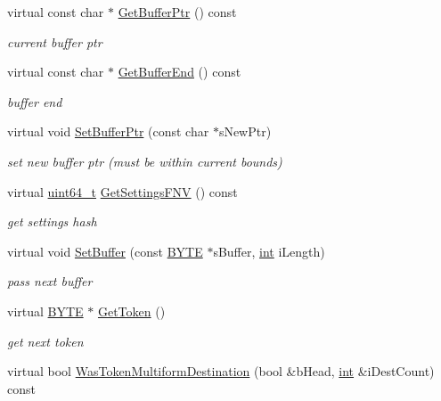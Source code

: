 \begin{DoxyCompactItemize}
virtual const char $\ast$ \hyperlink{classCSphTokenFilter_aafff5045f71b3c81e18985a59659bd18}{Get\-Buffer\-Ptr} () const 
\begin{DoxyCompactList}\small\item\em current buffer ptr \end{DoxyCompactList}\item 
virtual const char $\ast$ \hyperlink{classCSphTokenFilter_a01cda57b77357102db0d645db112fe66}{Get\-Buffer\-End} () const 
\begin{DoxyCompactList}\small\item\em buffer end \end{DoxyCompactList}\item 
virtual void \hyperlink{classCSphTokenFilter_a5dabfda2d463e74f3d6b2d8e05a11079}{Set\-Buffer\-Ptr} (const char $\ast$s\-New\-Ptr)
\begin{DoxyCompactList}\small\item\em set new buffer ptr (must be within current bounds) \end{DoxyCompactList}\item 
virtual \hyperlink{sphinxstd_8h_aaa5d1cd013383c889537491c3cfd9aad}{uint64\-\_\-t} \hyperlink{classCSphTokenFilter_aa8515a36b5d84b6d56856b80007cb11b}{Get\-Settings\-F\-N\-V} () const 
\begin{DoxyCompactList}\small\item\em get settings hash \end{DoxyCompactList}\item 
virtual void \hyperlink{classCSphTokenFilter_af2e40a7ad8e6abc189f1053db3b3b3cf}{Set\-Buffer} (const \hyperlink{sphinxstd_8h_a4ae1dab0fb4b072a66584546209e7d58}{B\-Y\-T\-E} $\ast$s\-Buffer, \hyperlink{sphinxexpr_8cpp_a4a26e8f9cb8b736e0c4cbf4d16de985e}{int} i\-Length)
\begin{DoxyCompactList}\small\item\em pass next buffer \end{DoxyCompactList}\item 
virtual \hyperlink{sphinxstd_8h_a4ae1dab0fb4b072a66584546209e7d58}{B\-Y\-T\-E} $\ast$ \hyperlink{classCSphTokenFilter_a3da18c0660751c7aca16d6e218eba5ab}{Get\-Token} ()
\begin{DoxyCompactList}\small\item\em get next token \end{DoxyCompactList}\item 
virtual bool \hyperlink{classCSphTokenFilter_ad14bbb208590a4dd93ab16c0d57409fd}{Was\-Token\-Multiform\-Destination} (bool \&b\-Head, \hyperlink{sphinxexpr_8cpp_a4a26e8f9cb8b736e0c4cbf4d16de985e}{int} \&i\-Dest\-Count) const 
\end{DoxyCompactItemize}
